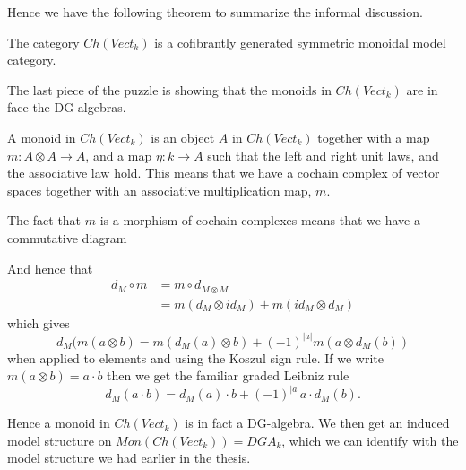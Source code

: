 Hence we have the following theorem to summarize the informal discussion. 

\begin{theorem}
The category $Ch(Vect_k)$ is a cofibrantly generated symmetric monoidal model category.
\end{theorem}

The last piece of the puzzle is showing that the monoids in $Ch(Vect_k)$ are in face the DG-algebras. 

A monoid in $Ch(Vect_k)$ is an object $A$ in $Ch(Vect_k)$ together with a map $m\colon A\otimes A\longrightarrow A$, and a map $\eta\colon k\longrightarrow A$ such that the left and right unit laws, and the associative law hold. This means that we have a cochain complex of vector spaces together with an associative multiplication map, $m$. 

The fact that $m$ is a morphism of cochain complexes means that we have a commutative diagram
\begin{center}
\end{center}
And hence that
\begin{align*}
    d_M\circ m
    &= m\circ d_{M\otimes M} \\
    &= m(d_M\otimes id_M) + m(id_M\otimes d_M)
\end{align*}
which gives 
\begin{equation*}
    d_M(m(a\otimes b) = m(d_M(a)\otimes b) + (-1)^{|a|}m(a\otimes d_M(b))
\end{equation*}
when applied to elements and using the Koszul sign rule. If we write $m(a\otimes b) = a\cdot b$ then we get the familiar graded Leibniz rule 
\begin{equation*}
    d_M(a\cdot b) = d_M(a)\cdot b + (-1)^{|a|}a\cdot d_M(b).
\end{equation*}

Hence a monoid in $Ch(Vect_k)$ is in fact a DG-algebra. We then get an induced model structure on $Mon(Ch(Vect_k)) = DGA_k$, which we can identify with the model structure we had earlier in the thesis.

